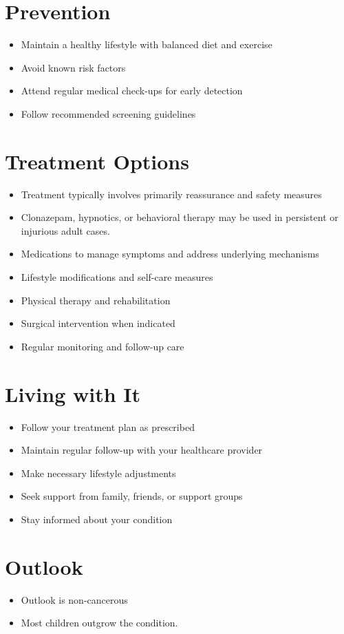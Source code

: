 \section{Prevention}
\begin{itemize}[noitemsep]
  \item Maintain a healthy lifestyle with balanced diet and exercise
  \item Avoid known risk factors
  \item Attend regular medical check-ups for early detection
  \item Follow recommended screening guidelines
\end{itemize}
\section{Treatment Options}
\begin{itemize}[noitemsep]
  \item Treatment typically involves primarily reassurance and safety measures
  \item Clonazepam, hypnotics, or behavioral therapy may be used in persistent or injurious adult cases.
  \item Medications to manage symptoms and address underlying mechanisms
  \item Lifestyle modifications and self-care measures
  \item Physical therapy and rehabilitation
  \item Surgical intervention when indicated
  \item Regular monitoring and follow-up care
\end{itemize}
\section{Living with It}
\begin{itemize}[noitemsep]
  \item Follow your treatment plan as prescribed
  \item Maintain regular follow-up with your healthcare provider
  \item Make necessary lifestyle adjustments
  \item Seek support from family, friends, or support groups
  \item Stay informed about your condition
\end{itemize}
\section{Outlook}
\begin{itemize}[noitemsep]
  \item Outlook is non-cancerous
  \item Most children outgrow the condition.
\end{itemize}
